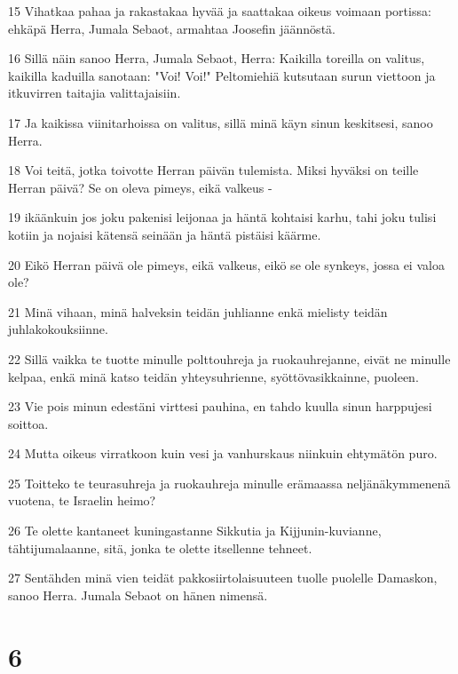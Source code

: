 \par 15 Vihatkaa pahaa ja rakastakaa hyvää ja saattakaa oikeus voimaan portissa: ehkäpä Herra, Jumala Sebaot, armahtaa Joosefin jäännöstä.
\par 16 Sillä näin sanoo Herra, Jumala Sebaot, Herra: Kaikilla toreilla on valitus, kaikilla kaduilla sanotaan: "Voi! Voi!" Peltomiehiä kutsutaan surun viettoon ja itkuvirren taitajia valittajaisiin.
\par 17 Ja kaikissa viinitarhoissa on valitus, sillä minä käyn sinun keskitsesi, sanoo Herra.
\par 18 Voi teitä, jotka toivotte Herran päivän tulemista. Miksi hyväksi on teille Herran päivä? Se on oleva pimeys, eikä valkeus -
\par 19 ikäänkuin jos joku pakenisi leijonaa ja häntä kohtaisi karhu, tahi joku tulisi kotiin ja nojaisi kätensä seinään ja häntä pistäisi käärme.
\par 20 Eikö Herran päivä ole pimeys, eikä valkeus, eikö se ole synkeys, jossa ei valoa ole?
\par 21 Minä vihaan, minä halveksin teidän juhlianne enkä mielisty teidän juhlakokouksiinne.
\par 22 Sillä vaikka te tuotte minulle polttouhreja ja ruokauhrejanne, eivät ne minulle kelpaa, enkä minä katso teidän yhteysuhrienne, syöttövasikkainne, puoleen.
\par 23 Vie pois minun edestäni virttesi pauhina, en tahdo kuulla sinun harppujesi soittoa.
\par 24 Mutta oikeus virratkoon kuin vesi ja vanhurskaus niinkuin ehtymätön puro.
\par 25 Toitteko te teurasuhreja ja ruokauhreja minulle erämaassa neljänäkymmenenä vuotena, te Israelin heimo?
\par 26 Te olette kantaneet kuningastanne Sikkutia ja Kijjunin-kuvianne, tähtijumalaanne, sitä, jonka te olette itsellenne tehneet.
\par 27 Sentähden minä vien teidät pakkosiirtolaisuuteen tuolle puolelle Damaskon, sanoo Herra. Jumala Sebaot on hänen nimensä.

\chapter{6}

